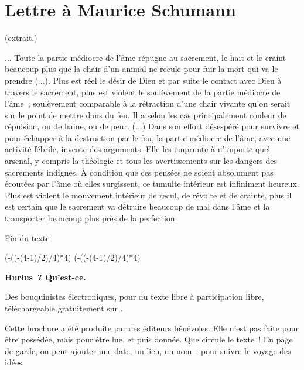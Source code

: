 \documentclass[french,twoside]{book} %
\newcommand\chapteropen{} %
\newcommand\chaptercont{} %
\newcommand\chapterclose{} %
\def\truncdiv#1#2{((#1-(#2-1)/2)/#2)}
\def\moduloop#1#2{(#1-\truncdiv{#1}{#2}*#2)}
\def\modulo#1#2{\number\numexpr\moduloop{#1}{#2}\relax}
\begin{document}
\begin{center}
\noindent \centerline{}
\end{center}

\chapterclose


\chapteropen
\chapter[{Lettre à Maurice Schumann}]{Lettre à Maurice Schumann}

\chaptercont

\begin{center}
\noindent \centerline{(extrait.)}\par
\end{center}

\noindent ... Toute la partie médiocre de l'âme répugne au sacrement, le hait et le craint beaucoup plus que la chair d'un animal ne recule pour fuir la mort qui va le prendre (...). Plus est réel le désir de Dieu et par suite le contact avec Dieu à travers le sacrement, plus est violent le soulèvement de la partie médiocre de l'âme ; soulèvement comparable à la rétraction d'une chair vivante qu'on serait sur le point de mettre dans du feu. Il a selon les cas principalement couleur de répulsion, ou de haine, ou de peur. (...) Dans son effort désespéré pour survivre et pour échapper à la destruction par le feu, la partie médiocre de l'âme, avec une activité fébrile, invente des arguments. Elle les emprunte à n'importe quel arsenal, y compris la théologie et tous les avertissements sur les dangers des sacrements indignes. À condition que ces pensées ne soient absolument pas écoutées par l'âme où elles surgissent, ce tumulte intérieur est infiniment heureux. Plus est violent le mouvement intérieur de recul, de révolte et de crainte, plus il est certain que le sacrement va détruire beaucoup de mal dans l'âme et la transporter beaucoup plus près de la perfection.\par
Fin du texte
\chapterclose

\chapterclose

 


\ifbooklet
  \pagestyle{empty}
  \clearpage
  \ifnum\modulo{\value{page}}{4}=0 \hbox{}\newpage\hbox{}\newpage\fi
  \ifnum\modulo{\value{page}}{4}=1 \hbox{}\newpage\hbox{}\newpage\fi


  \hbox{}\newpage
  \ifodd\value{page}\hbox{}\newpage\fi
  {\centering\color{rubric}\bfseries\noindent\large
    Hurlus ? Qu’est-ce.\par
    \bigskip
  }
  \noindent Des bouquinistes électroniques, pour du texte libre à participation libre,
  téléchargeable gratuitement sur \href{https://hurlus.fr}{}.\par
  \bigskip
  \noindent Cette brochure a été produite par des éditeurs bénévoles.
  Elle n’est pas faîte pour être possédée, mais pour être lue, et puis donnée.
  Que circule le texte !
  En page de garde, on peut ajouter une date, un lieu, un nom ; pour suivre le voyage des idées.
  \par
\end{document}
